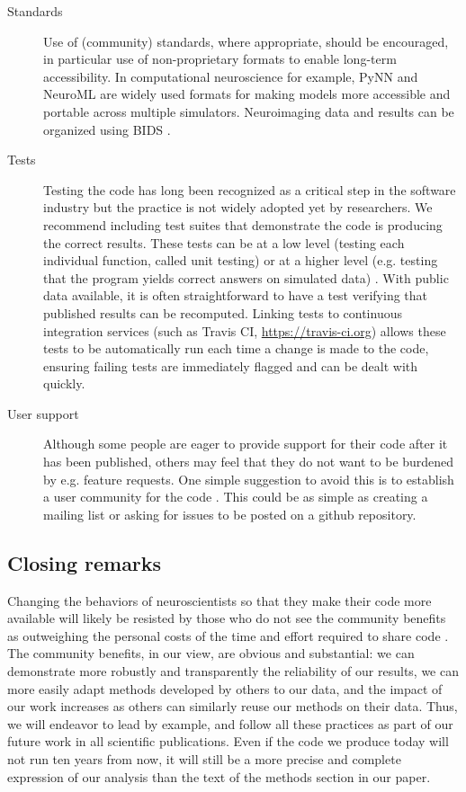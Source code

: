 \documentclass[11pt]{article}
\begin{document}
\begin{description}
  
\item [Standards] Use of (community) standards, where appropriate, should
  be encouraged, in particular use of non-proprietary formats
  to enable long-term accessibility.
  In computational neuroscience for example, PyNN
  \cite{Davison2009} and NeuroML \cite{CannonEtAl2014} are widely used
  formats for making models more accessible and portable across
  multiple simulators.  Neuroimaging data and results can be organized
  using BIDS \cite{Gorgolewski2016}.


\item [Tests] Testing the code has long been recognized
  as a critical step in the software industry but the practice is not
  widely adopted yet by researchers. We recommend including test
  suites that demonstrate the code is producing the correct
  results\cite{Axelrod2014-xi}. These tests can be at a low level
  (testing each individual function, called unit testing) or at a
  higher level (e.g. testing that the program yields correct answers
  on simulated data) \cite{wilson_best_2014}. With public data available,
  it is often straightforward to have a test verifying that published
  results can be recomputed. Linking tests to continuous 
  integration services (such as Travis CI, \url{https://travis-ci.org}) allows 
  these tests to be automatically run each time a change is made to the code,
  ensuring failing tests are immediately flagged and can be dealt with quickly.

\item [User support] Although some people are eager to provide support
  for their code after it has been published, others may feel that
  they do not want to be burdened by e.g. feature requests.  One
  simple suggestion to avoid this is to establish a user community for
  the code \cite{Gorgolewski2016b}.  This could be as simple as
  creating a mailing list or asking for issues to be posted on a
  github repository.

\end{description}

\subsection*{Closing remarks}

Changing the behaviors of neuroscientists so that they make their code more
available will likely be resisted by those who do not see the community
benefits as outweighing the personal costs of the time and effort required to
share code \cite{stodden2010scientific}. The community benefits, in our view,
are obvious and substantial: we can demonstrate more robustly and transparently
the reliability of our results, we can more easily adapt methods developed by
others to our data, and the impact of our work increases as others can
similarly reuse our methods on their data. Thus, we will endeavor to lead by
example, and follow all these practices as part of our future work in all
scientific publications. Even if the code we produce today will not run ten
years from now, it will still be a more precise and complete expression of our
analysis than the text of the methods section in our paper. 
\end{document}
